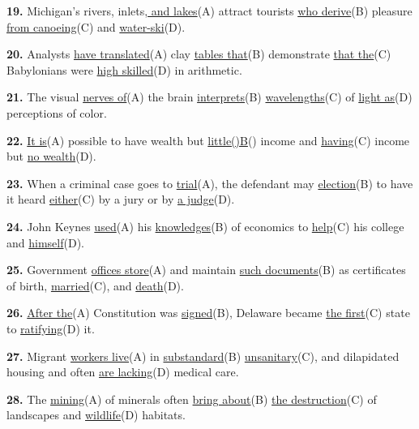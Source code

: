 \documentclass[12pt]{article}
\begin{document}
\vspace{\questionblockgap}
\noindent\textbf{19.} Michigan's rivers, inlets,\uline{ and lakes}(A) attract tourists \uline{who derive}(B) pleasure \uline{from canoeing}(C) and \uline{water-ski}(D).
\par
\vspace{\questionblockgap}
\noindent\textbf{20.} Analysts \uline{have translated}(A) clay \uline{tables that}(B) demonstrate \uline{that the}(C) Babylonians were \uline{high skilled}(D) in arithmetic.
\par
\vspace{\questionblockgap}
\noindent\textbf{21.} The visual \uline{nerves of}(A) the brain \uline{interprets}(B) \uline{wavelengths}(C) of \uline{light as}(D) perceptions of color.
\par
\vspace{\questionblockgap}
\noindent\textbf{22.} \uline{It is}(A) possible to have wealth but \uline{little()B}() income and \uline{having}(C) income but \uline{no wealth}(D).
\par
\vspace{\questionblockgap}
\noindent\textbf{23.} When a criminal case goes to \uline{trial}(A), the defendant may \uline{election}(B) to have it heard \uline{either}(C) by a jury or by \uline{a judge}(D).
\par
\vspace{\questionblockgap}
\noindent\textbf{24.} John Keynes \uline{used}(A) his \uline{knowledges}(B) of economics to \uline{help}(C) his college and \uline{himself}(D).
\par
\vspace{\questionblockgap}
\noindent\textbf{25.} Government \uline{offices store}(A) and maintain \uline{such documents}(B) as certificates of birth, \uline{married}(C), and \uline{death}(D).
\par
\vspace{\questionblockgap}
\noindent\textbf{26.} \uline{After the}(A) Constitution was \uline{signed}(B), Delaware became \uline{the first}(C) state to \uline{ratifying}(D) it.
\par
\vspace{\questionblockgap}
\noindent\textbf{27.} Migrant \uline{workers live}(A) in \uline{substandard}(B) \uline{unsanitary}(C), and dilapidated housing and often \uline{are lacking}(D) medical care.
\par
\vspace{\questionblockgap}
\noindent\textbf{28.} The \uline{mining}(A) of minerals often \uline{bring about}(B) \uline{the destruction}(C) of landscapes and \uline{wildlife}(D) habitats.
\end{document}
